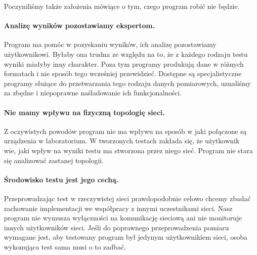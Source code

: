 \documentclass[00-praca-magisterska.tex]{subfiles}
\begin{document}

Poczyniliśmy także założenia mówiące o tym, czego program robić nie będzie.

\paragraph{Analizę wyników pozostawiamy ekspertom.} Program ma pomóc w
pozyskaniu wyników, ich analizę pozostawiamy użytkownikowi. Byłaby ona trudna ze
względu na to, że z każdego rodzaju testu wyniki miałyby inny charakter. Poza
tym programy produkują dane w różnych formatach i nie sposób tego wcześniej
przewidzieć. Dostępne są specjalistyczne programy służące do przetwarzania tego
rodzaju danych pomiarowych, uznaliśmy za zbędne i niepoprawne naśladowanie ich
funkcjonalności.

\paragraph{Nie mamy wpływu na fizyczną topologię sieci.} Z oczywistych powodów
program nie ma wpływu na sposób w jaki połączone są urządzenia w laboratorium. W
tworzonych testach zakłada się, że użytkownik wie, jaki wpływ na wyniki testu ma
stworzona przez niego sieć. Program nie stara się analizować zastanej topologii.

\paragraph{Środowisko testu jest jego cechą.} Przeprowadzając test w
rzeczywistej sieci prawdopodobnie celowo chcemy zbadać zachowanie implementacji
we współpracy z innymi uczestnikami sieci. Nasz program nie wymusza wyłączności
na komunikację sieciową ani nie monitoruje innych użytkowników sieci. Jeśli do
poprawnego przeprowadzenia pomiaru wymagane jest, aby testowany program był
jedynym użytkownikiem sieci, osoba wykonująca test sama musi o to zadbać.
\end{document}
